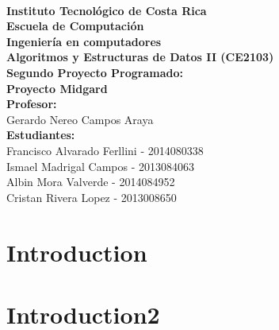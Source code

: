 \documentclass[showkeys,eqsecnum,prd,showpacs,notitlepage,12pt]{article}
\title{}
\date{}
\begin{document}

\setlength{\unitlength}{0,5 cm} %
\thispagestyle{empty}

\begin{center}
\textbf{}\\[4cm]
\textbf{{\Huge Instituto Tecnológico de Costa Rica}}\\[2cm]
\textbf{{\LARGE Escuela de Computación}}\\[1cm]
\textbf{{\LARGE Ingeniería en computadores}}\\[1cm]
\textbf{{\LARGE Algoritmos y Estructuras de Datos II (CE2103)}}\\[2,3cm]


{\LARGE \textbf{Segundo Proyecto Programado:}}\\[1cm]
{\LARGE \textbf{Proyecto  Midgard}}\\[2cm]

\textbf{{\large Profesor:  }}\\[0,2cm]
{\large Gerardo Nereo Campos Araya}\\[1cm]

\textbf{{\large Estudiantes: }}\\[0,2cm]
{\large Francisco Alvarado Ferllini - 2014080338}\\[0,3cm]
{\large Ismael Madrigal Campos - 2013084063}\\[0,3cm]
{\large Albin Mora Valverde - 2014084952}\\[0,3cm]
{\large Cristan Rivera Lopez - 2013008650}\\[0,3cm]

\end{center}

\maketitle

\section{Introduction}
\section{Introduction2}
\end{document}
